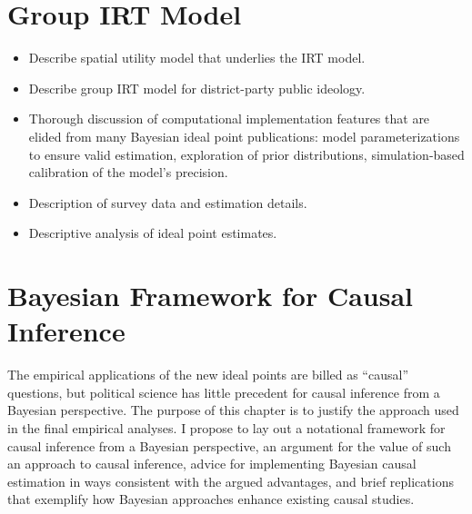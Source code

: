 \documentclass[12pt
              ]{article}
\begin{document}
\section{Group IRT Model}

\begin{itemize}
  \item Describe spatial utility model that underlies the IRT model.
  \item Describe group IRT model for district-party public ideology.
  \item Thorough discussion of computational implementation features that are elided from many Bayesian ideal point publications: model parameterizations to ensure valid estimation, exploration of prior distributions, simulation-based calibration of the model's precision.
  \item Description of survey data and estimation details.
  \item Descriptive analysis of ideal point estimates.
\end{itemize}

 
\section{Bayesian Framework for Causal Inference}

The empirical applications of the new ideal points are billed as ``causal'' questions, but political science has little precedent for causal inference from a Bayesian perspective.
The purpose of this chapter is to justify the approach used in the final empirical analyses.
I propose to lay out a notational framework for causal inference from a Bayesian perspective, an argument for the value of such an approach to causal inference, advice for implementing Bayesian causal estimation in ways consistent with the argued advantages, and brief replications that exemplify how Bayesian approaches enhance existing causal studies.
\end{document}
